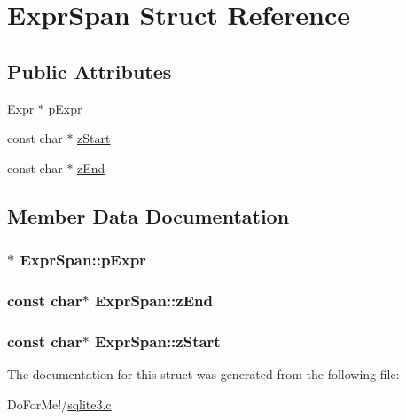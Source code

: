 \hypertarget{struct_expr_span}{\section{Expr\-Span Struct Reference}
\label{struct_expr_span}
}
\subsection*{Public Attributes}
\begin{DoxyCompactItemize}
\item 
\hyperlink{struct_expr}{Expr} $\ast$ \hyperlink{struct_expr_span_a081c4aa031331c8518c1173b2a8335cc}{p\-Expr}
\item 
const char $\ast$ \hyperlink{struct_expr_span_af4653638d7e67a62e7a607f682b38e25}{z\-Start}
\item 
const char $\ast$ \hyperlink{struct_expr_span_a7cdf42cea729fcb5a1c477c3825ab575}{z\-End}
\end{DoxyCompactItemize}


\subsection{Member Data Documentation}
\hypertarget{struct_expr_span_a081c4aa031331c8518c1173b2a8335cc}{
\subsubsection[{p\-Expr}]{$\ast$ Expr\-Span\-::p\-Expr}}\label{struct_expr_span_a081c4aa031331c8518c1173b2a8335cc}
\hypertarget{struct_expr_span_a7cdf42cea729fcb5a1c477c3825ab575}{
\subsubsection[{z\-End}]{\setlength{\rightskip}{0pt plus 5cm}const char$\ast$ Expr\-Span\-::z\-End}}\label{struct_expr_span_a7cdf42cea729fcb5a1c477c3825ab575}
\hypertarget{struct_expr_span_af4653638d7e67a62e7a607f682b38e25}{
\subsubsection[{z\-Start}]{\setlength{\rightskip}{0pt plus 5cm}const char$\ast$ Expr\-Span\-::z\-Start}}\label{struct_expr_span_af4653638d7e67a62e7a607f682b38e25}


The documentation for this struct was generated from the following file\-:\begin{DoxyCompactItemize}
\item 
Do\-For\-Me!/\hyperlink{sqlite3_8c}{sqlite3.\-c}\end{DoxyCompactItemize}
